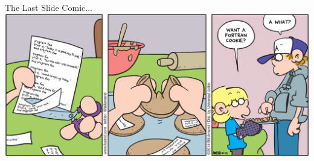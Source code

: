 \documentclass[11pt]{beamer}
\begin{document}
\begin{frame}{The Last Slide Comic...}
\center
\includegraphics[scale=0.15]{fortranCookie.png}
\end{frame}
\end{document}
